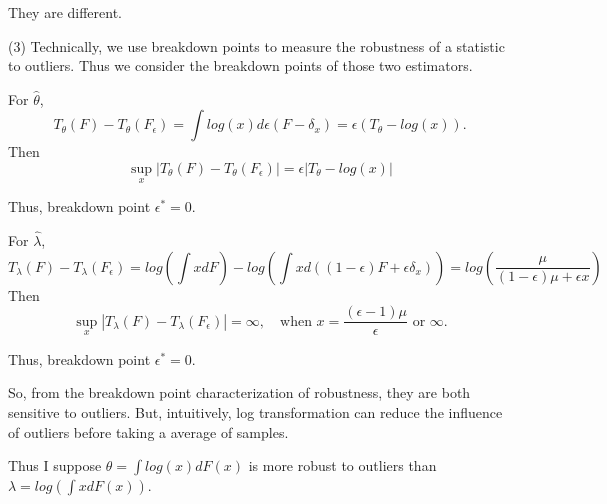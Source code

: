 \begin{solution}
    They are different.

    (3) Technically, we use breakdown points to measure the robustness of a statistic to outliers. Thus we consider the breakdown points of those two estimators.
    
    For $\hat{\theta}$, 
    \begin{equation*}
        T_\theta(F) - T_\theta(F_\epsilon) = \int log(x) d \epsilon (F -\delta_x)
        = \epsilon (T_\theta - log(x)).
    \end{equation*}
    Then
    \begin{equation*}
        \sup_x | T_\theta(F) - T_\theta(F_\epsilon) | = \epsilon |T_\theta - log(x)|
    \end{equation*}

    Thus, breakdown point $\epsilon^* = 0$.

    For $\hat{\lambda}$, 
    \begin{equation*}
        T_\lambda(F) - T_\lambda(F_\epsilon) = log \left( \int x d F \right) - log \left( \int x d( (1-\epsilon)F + \epsilon \delta_x)\right)
        = log\left(\frac{\mu}{(1-\epsilon)\mu + \epsilon x}\right)
    \end{equation*}
    Then
    \begin{equation*}
        \sup_x | T_\lambda(F) - T_\lambda(F_\epsilon) | 
        =  \infty,
        \quad \text{when } x = \frac{(\epsilon - 1)\mu}{\epsilon} \text{ or } \infty.
    \end{equation*}

    Thus, breakdown point $\epsilon^* = 0$.

    So, from the breakdown point characterization of robustness, they are both sensitive to outliers. 
    But, intuitively, log transformation can reduce the influence of outliers before taking a average of samples. 
    
    Thus I suppose $\theta= \int log(x) d F(x)$ is more robust to outliers than $\lambda = log \left( \int  x d F(x) \right)$.

\end{solution}
